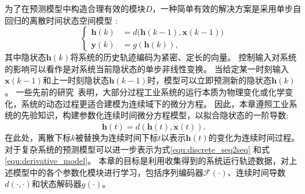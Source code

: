 为了在预测模型中构造合理有效的模块$D$，一种简单有效的解决方案是采用单步自回归的离散时间状态空间模型 \cite{4019326}:
\begin{equation}
\left\{    \begin{aligned}
\boldsymbol{h}(k)&=d\big(\boldsymbol{h}(k-1), \boldsymbol{x}(k-1)\big)\\
\boldsymbol{y}(k)&=g(\boldsymbol{h}(k)),
    \end{aligned}
    \right.
\end{equation}
其中隐状态$\boldsymbol{h}(k)$将系统的历史轨迹编码为紧密、定长的向量。
控制输入对系统的影响可以看作是对系统当前隐状态的单步非线性变换。
当给定某一时刻输入$\boldsymbol{x}(k-1)$和上一时刻隐状态$\boldsymbol{h}(k-1)$时，模型可以立即预测新的隐状态$\boldsymbol{h}(k)$。
一些先前的研究~\cite{CHAI201661,KIM2004403}表明，大部分过程工业系统的运行本质为物理变化或化学变化，系统的动态过程更适合建模为连续域下的微分方程。
因此，本章遵照工业系统的先验知识，构建参数化连续时间微分方程模型，以拟合隐状态的一阶导数:
\begin{equation}
    \label{equ:derivative_model}
    \dot{\boldsymbol h}(t) = d(\boldsymbol{h}(t), \boldsymbol x(t)).
\end{equation}
在此处，离散下标$k$被替换为连续时间下标$t$以表示$\boldsymbol{h}(t)$的变化为连续时间过程。
对于复杂系统的预测模型可以进一步表示为式\eqref{equ:discrete_seq2seq} 和式 \eqref{equ:derivative_model}。
本章的目标是利用收集得到的系统运行轨迹数据，对上述模型中的各个参数化模块进行学习，包括序列编码器$\mathcal{F}(\cdot)$、连续时间导数$d(\cdot,\cdot)$和状态解码器$g(\cdot)$。
